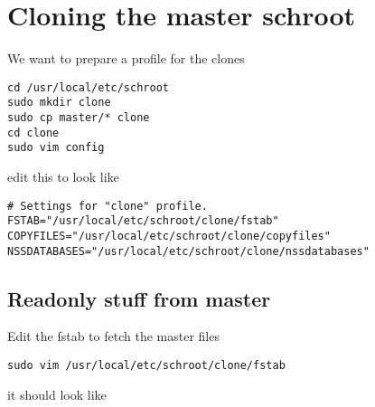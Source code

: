 \documentclass[a4paper]{book}
\begin{document}
\section{Cloning the master schroot}

We want to prepare a profile for the clones

\begin{verbatim}
cd /usr/local/etc/schroot
sudo mkdir clone
sudo cp master/* clone
cd clone
sudo vim config
\end{verbatim}

edit this to look like

\begin{verbatim}
# Settings for "clone" profile.
FSTAB="/usr/local/etc/schroot/clone/fstab"
COPYFILES="/usr/local/etc/schroot/clone/copyfiles"
NSSDATABASES="/usr/local/etc/schroot/clone/nssdatabases"
\end{verbatim}

\subsection{Readonly stuff from master}

Edit the fstab to fetch the master files

\begin{verbatim}
sudo vim /usr/local/etc/schroot/clone/fstab
\end{verbatim}

it should look like
\end{document}
